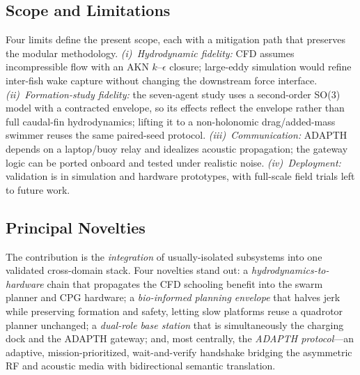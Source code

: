 \documentclass[journal]{IEEEtran}
\begin{document}
\subsection{Scope and Limitations}
\label{sec:disc}
Four limits define the present scope, each with a mitigation path that preserves the
modular methodology. \emph{(i)~Hydrodynamic fidelity:} CFD assumes incompressible
flow with an AKN $k$--$\epsilon$ closure; large-eddy simulation would refine
inter-fish wake capture without changing the downstream force interface.
\emph{(ii)~Formation-study fidelity:} the seven-agent study uses a second-order
SO(3) model with a contracted envelope, so its effects reflect the envelope rather
than full caudal-fin hydrodynamics; lifting it to a non-holonomic drag/added-mass
swimmer reuses the same paired-seed protocol. \emph{(iii)~Communication:} ADAPTH
depends on a laptop/buoy relay and idealizes acoustic propagation; the gateway logic
can be ported onboard and tested under realistic noise. \emph{(iv)~Deployment:}
validation is in simulation and hardware prototypes, with full-scale field trials
left to future work.

\subsection{Principal Novelties}
\label{sec:novelty}
The contribution is the \emph{integration} of usually-isolated subsystems into one
validated cross-domain stack. Four novelties stand out: a
\emph{hydrodynamics-to-hardware} chain that propagates the CFD schooling benefit
into the swarm planner and CPG hardware; a \emph{bio-informed planning envelope}
that halves jerk while preserving formation and safety, letting slow platforms reuse
a quadrotor planner unchanged; a \emph{dual-role base station} that is simultaneously
the charging dock and the ADAPTH gateway; and, most centrally, the \emph{ADAPTH
protocol}---an adaptive, mission-prioritized, wait-and-verify handshake bridging the
asymmetric RF and acoustic media with bidirectional semantic translation.
\end{document}
